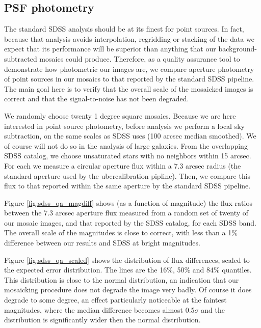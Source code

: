 \documentclass[10pt,preprint]{aastex}
\begin{document}
\subsection{PSF photometry}
\label{sec:psfs}

The standard SDSS analysis should be at its finest for point sources.
In fact, because that analysis avoids interpolation, regridding or
stacking of the data we expect that its performance will be superior
than anything that our background-subtracted mosaics could
produce. Therefore, as a quality assurance tool to demonstrate how
photometric our images are, we compare aperture photometry of point
sources in our mosaics to that reported by the standard SDSS
pipeline. The main goal here is to verify that the overall scale of
the mosaicked images is correct and that the signal-to-noise has not
been degraded.

We randomly choose twenty 1 degree square mosaics. Because we are here
interested in point source photometry, before analysis we perform a
local sky subtraction, on the same scales as SDSS uses (100 arcsec
median smoothed).  We of course will not do so in the analysis of
large galaxies. From the overlapping SDSS catalog, we choose
unsaturated stars with no neighbors within 15 arcsec.  For each we
measure a circular aperture flux within a 7.3 arcsec radius (the
standard aperture used by the ubercalibration pipline).  Then, we
compare this flux to that reported within the same aperture by the
standard SDSS pipeline.

Figure \ref{fig:sdss_qa_magdiff} shows (as a function of magnitude)
the flux ratios between the 7.3 arcsec aperture flux measured from a
random set of twenty of our mosaic images, and that reported by the
SDSS catalog, for each SDSS band. The overall scale of the magnitudes
is close to correct, with less than a 1\% difference between our
results and SDSS at bright magnitudes.

Figure \ref{fig:sdss_qa_scaled} shows the distribution of flux
differences, scaled to the expected error distribution. The lines are
the 16\%, 50\% and 84\% quantiles. This distribution is close to the
normal distribution, an indication that our mosaicking procedure does
not degrade the image very badly.  Of course it does degrade to some
degree, an effect particularly noticeable at the faintest magnitudes,
where the median difference becomes almost 0.5$\sigma$ and the
distribution is significantly wider then the normal distribution.
\end{document}
